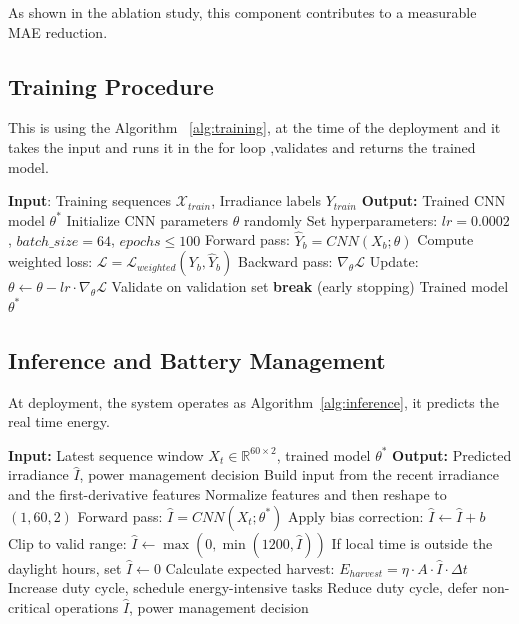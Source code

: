 \documentclass[journal]{IEEEtran}
\begin{document}
As shown in the ablation study, this component contributes to a measurable MAE reduction.

\subsection{Training Procedure}
This is using the Algorithm ~\ref{alg:training}, at the time of the deployment and it takes the input and runs it in the for loop ,validates and returns the trained model.
\begin{algorithm}[!t]
\caption{CNN Training for Solar Prediction}
\label{alg:training}
\begin{algorithmic}[1]
\STATE \textbf{Input}: Training sequences $\mathcal{X}_{train}$, Irradiance labels
$Y_{train}$
\STATE \textbf{Output:} Trained CNN model $\theta^*$
\STATE
\STATE Initialize CNN parameters $\theta$ randomly
\STATE Set hyperparameters: $lr=0.0002$, $batch\_size=64$, $epochs\le100$
\STATE
{}
        \STATE Forward pass: $\hat{Y}_b = CNN(X_b; \theta)$
        \STATE Compute weighted loss: $\mathcal{L} = \mathcal{L}_{weighted}(Y_b,
\hat{Y}_b)$
        \STATE Backward pass: $\nabla_\theta \mathcal{L}$
        \STATE Update: $\theta \leftarrow \theta - lr \cdot \nabla_\theta \mathcal{L}$
    \ENDFOR
    \STATE
    \STATE Validate on validation set
        \STATE \textbf{break} (early stopping)
    \ENDIF
\ENDFOR
\STATE
\RETURN Trained model $\theta^*$
\end{algorithmic}
\end{algorithm}

\subsection{Inference and Battery Management}
At deployment, the system operates as Algorithm~\ref{alg:inference}, it predicts the real time energy.

\begin{algorithm}[!t]
\caption{Real-Time Energy Prediction}
\label{alg:inference}
\begin{algorithmic}[1]
\STATE \textbf{Input:} Latest sequence window $X_t\in\mathbb{R}^{60\times2}$, trained model $\theta^*$
\STATE \textbf{Output:} Predicted irradiance $\hat{I}$, power management decision
\STATE
\STATE Build input from the recent irradiance and the first-derivative features
\STATE Normalize features and then reshape to $(1,60,2)$
\STATE Forward pass: $\hat{I} = CNN(X_t; \theta^*)$
\STATE Apply bias correction: $\hat{I} \leftarrow \hat{I} + b$
\STATE Clip to valid range: $\hat{I} \leftarrow \max(0, \min(1200, \hat{I}))$
\STATE If local time is outside the daylight hours, set $\hat{I}\leftarrow0$
\STATE
\STATE Calculate expected harvest: $E_{harvest} = \eta \cdot A \cdot \hat{I} \cdot
\Delta t$
    \STATE Increase duty cycle, schedule energy-intensive tasks
\ELSE
    \STATE Reduce duty cycle, defer non-critical operations
\ENDIF
\STATE
\RETURN $\hat{I}$, power management decision
\end{algorithmic}
\end{algorithm}
\end{document}

